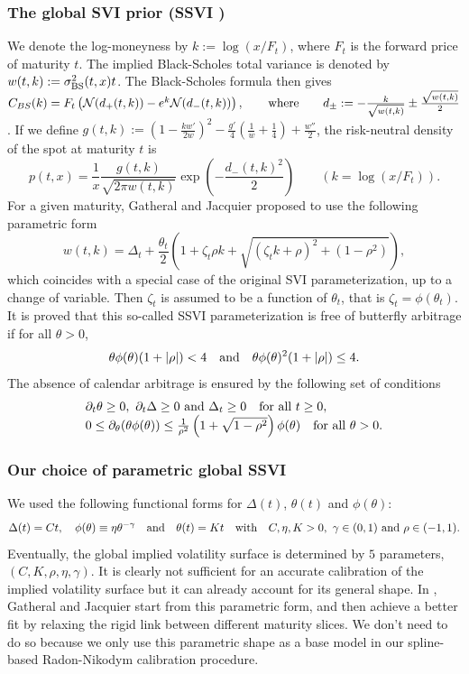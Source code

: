 \documentclass[a4paper]{article}
\newcommand{\1}{\textbf{1}}
\begin{document}
\subsubsection*{The global SVI prior (SSVI \cite{GatheralJacquierGlobalSVI})}
\par We denote the log-moneyness by $k := \log(x/F_t)$, where $F_t$ is the forward price of maturity $t$. The implied Black-Scholes total variance is denoted by $w(t,k) := \sigma_{\textnormal{BS}}^2(t,x) t$. The Black-Scholes formula then gives $C_{BS}(k) = F_t \left( \mathcal{N}(d_+(t,k)) - e^k \mathcal{N}(d_-(t,k)) \right), \qquad \textnormal{where} \qquad d_{\pm} := -\frac{k}{\sqrt{w(t,k)}} \pm \frac{\sqrt{w(t,k)}}{2}$. If we define $g(t,k) := \left( 1 - \frac{k w'}{2w}\right)^2 - \frac{g'}{4} \left( \frac{1}{w} + \frac{1}{4} \right) + \frac{w''}{2}$, the risk-neutral density of the spot at maturity $t$ is 
$$
p(t,x) = \frac{1}{x}\frac{g(t,k)}{\sqrt{2 \pi w(t,k)}} \exp\left(-\frac{d_-(t,k)^2}{2}\right) \qquad (k = \log(x / F_t)).
$$
For a given maturity, Gatheral and Jacquier proposed to use the following parametric form
$$
w(t,k) = \Delta_t + \frac{\theta_t}{2} \left( 1 + \zeta_t \rho k + \sqrt{(\zeta_t k + \rho)^2 + (1-\rho^2)}\right),
$$
which coincides with a special case of the original SVI parameterization, up to a change of variable. Then $\zeta_t$ is assumed to be a function of $\theta_t$, that is $\zeta_t = \phi(\theta_t)$. It is proved that this so-called SSVI parameterization is free of butterfly arbitrage if for all $\theta > 0$,
$$
\theta \phi(\theta) (1 + |\rho|) < 4 \quad \textnormal{and} \quad \theta \phi(\theta)^2 (1 + |\rho|) \leq 4.
$$
The absence of calendar arbitrage is ensured by the following set of conditions
$$
\begin{array}{ll}
\partial_t \theta \geq 0, \ \partial_t \Delta \geq 0 \ \textnormal{and} \ \Delta_t \geq 0 \quad \textnormal{for all} \ t \geq 0,\\
0 \leq \partial_\theta(\theta \phi(\theta)) \leq \frac{1}{\rho^2} \left( 1 + \sqrt{1 - \rho^2}\right) \phi(\theta) \quad \textnormal{for all} \ \theta >0. 
\end{array}
$$
\subsubsection*{Our choice of parametric global SSVI}
\par We used the following functional forms for  $\Delta(t)$, $\theta(t)$ and $\phi(\theta)$:
$$
\Delta(t) = C t, \quad \phi(\theta) \equiv \eta \theta^{-\gamma} \quad \textnormal{and} \quad \theta(t) = Kt \quad \textnormal{with} \quad C, \eta, K >0, \ \gamma \in (0, 1)\ \textnormal{and} \ \rho \in (-1,1) . 
$$
Eventually, the global implied volatility surface is determined by $5$ parameters, $(C, K, \rho, \eta, \gamma)$. It is clearly not sufficient for an accurate calibration of the implied volatility surface but it can already account for its general shape. In \cite{GatheralJacquierGlobalSVI}, Gatheral and Jacquier start from this parametric form, and then achieve a better fit by relaxing the rigid link between different maturity slices. We don't need to do so because we only use this parametric shape as a base model in our spline-based Radon-Nikodym calibration procedure. 
\end{document}
